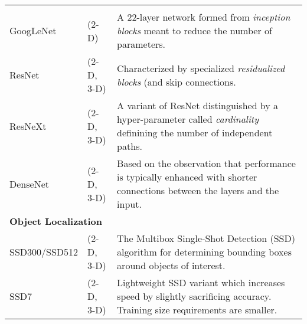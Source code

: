 \begin{table}[!htb]
\begin{tabular*}{\textwidth}{ll@{\extracolsep{\fill}}l}
\begin{minipage}[t]{0.6\columnwidth}
    \end{minipage} \\ \vspace{0.2cm} 
  GoogLeNet \cite{Szegedy:2015} & (2-D) & 
    \begin{minipage}[t]{0.6\columnwidth}%
        A 22-layer network formed from {\em inception blocks} meant
        to reduce the number of parameters.
    \end{minipage} \\ \vspace{0.2cm} 
  ResNet \cite{He:2015}  & (2-D, 3-D) & 
    \begin{minipage}[t]{0.6\columnwidth}%
        Characterized by specialized {\em residualized blocks} (and
        skip connections. %
    \end{minipage} \\ \vspace{0.2cm} 
  ResNeXt \cite{Xie:2016} & (2-D, 3-D) &
    \begin{minipage}[t]{0.6\columnwidth}%
        A variant of ResNet distinguished by a hyper-parameter called 
        {\em cardinality} definining the number of independent paths. %
    \end{minipage} \\ \vspace{0.3cm} 
  DenseNet \cite{Huang:2016} & (2-D, 3-D) & 
    \begin{minipage}[t]{0.6\columnwidth}%
        Based on the observation that performance is typically enhanced 
        with shorter connections between the layers and the input.%
    \end{minipage} \\
\midrule    
\multicolumn{3}{l}{\textbf{Object Localization}} 
  \vspace{0.25cm} \\ \vspace{0.2cm} 
  SSD300/SSD512 \cite{Liu:2015} & (2-D, 3-D) & 
    \begin{minipage}[t]{0.6\columnwidth}%
        The Multibox Single-Shot Detection (SSD) algorithm for
        determining bounding boxes around objects of interest. %
    \end{minipage} \\ \vspace{0.2cm} 
  SSD7 \cite{ssd7} & (2-D, 3-D) & 
    \begin{minipage}[t]{0.6\columnwidth}%
        Lightweight SSD variant which increases speed by slightly sacrificing
        accuracy.  Training size requirements are smaller. %
  \end{minipage} \\
\bottomrule
\end{tabular*}
\end{table}



